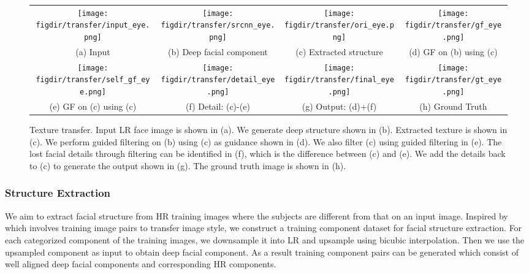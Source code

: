 \documentclass{article}
\newcommand{\figdir}{figures}
\begin{document}
\renewcommand{\tabcolsep}{.1pt}
\begin{figure*}[t]
\def\wfour{0.24\linewidth}
\begin{center}
\begin{tabular}{cccc}
\vspace{-1mm}\texttt{[image: \\figdir/transfer/input\_eye.png]}&
\texttt{[image: \\figdir/transfer/srcnn\_eye.png]}&
\texttt{[image: \\figdir/transfer/ori\_eye.png]}&
\texttt{[image: \\figdir/transfer/gf\_eye.png]}\\
\small{(a) Input}&\small{(b) Deep facial component}&\small{(c) Extracted structure}&\small{(d) GF on (b) using (c)}\\
\vspace{-1mm}\texttt{[image: \\figdir/transfer/self\_gf\_eye.png]}&
\texttt{[image: \\figdir/transfer/detail\_eye.png]}&
\texttt{[image: \\figdir/transfer/final\_eye.png]}&
\texttt{[image: \\figdir/transfer/gt\_eye.png]}\\
\small{(e) GF on (c) using (c)}&\small{(f) Detail: (c)-(e)}&\small{(g) Output: (d)+(f)}&\small{(h) Ground Truth}\\
\end{tabular}
\end{center}
\vspace{-5mm}
\caption{Texture transfer. Input LR face image is shown in (a). We generate deep structure shown in (b). Extracted texture is shown in (c). We perform guided filtering on (b) using (c) as guidance shown in (d). We also filter (c) using guided filtering in (e). The lost facial details through filtering can be identified in (f), which is the difference between (c) and (e). We add the details back to (c) to generate the output shown in (g). The ground truth image is shown in (h).}
\label{fig:structure_transfer}
\end{figure*}


\subsubsection{Structure Extraction}
We aim to extract facial structure from HR training images where the subjects are different from that on an input image. Inspired by \cite{hertzmann-siggraph01-analogy} which involves training image pairs to transfer image style, we construct a training component dataset for facial structure extraction. For each categorized component of the training images, we downsample it into LR and upsample using bicubic interpolation. Then we use the upsampled component as input to obtain deep facial component. As a result training component pairs can be generated which consist of well aligned deep facial components and corresponding HR components.
\end{document}
